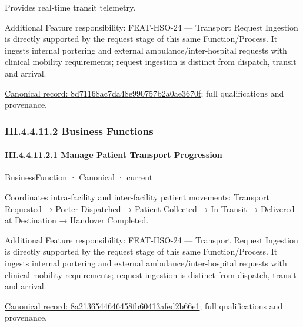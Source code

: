 Provides real-time transit telemetry.



Additional Feature responsibility: FEAT-HSO-24 — Transport Request Ingestion is directly supported by the request stage of this same Function/Process. It ingests internal portering and external ambulance/inter-hospital requests with clinical mobility requirements; request ingestion is distinct from dispatch, transit and arrival.


{\footnotesize \href{../../../../../../../continuum/business/business-service/8d71168ac7da48e990757b2a0ae3670f.md}{Canonical record: 8d71168ac7da48e990757b2a0ae3670f}; full qualifications and provenance.}\par
\subsubsection*{III.4.4.11.2 Business Functions}
\label{navigation:III.4.4.11.2}

\paragraph*{III.4.4.11.2.1 Manage Patient Transport Progression}
\label{navigation:III.4.4.11.2.1}

\label{element:8a2136544646458fb60413afed2b66e1}
{\small BusinessFunction · Canonical · current}\par

Coordinates intra-facility and inter-facility patient movements: Transport Requested → Porter Dispatched → Patient Collected → In-Transit → Delivered at Destination → Handover Completed.



Additional Feature responsibility: FEAT-HSO-24 — Transport Request Ingestion is directly supported by the request stage of this same Function/Process. It ingests internal portering and external ambulance/inter-hospital requests with clinical mobility requirements; request ingestion is distinct from dispatch, transit and arrival.


{\footnotesize \href{../../../../../../../continuum/business/business-function/8a2136544646458fb60413afed2b66e1.md}{Canonical record: 8a2136544646458fb60413afed2b66e1}; full qualifications and provenance.}\par
